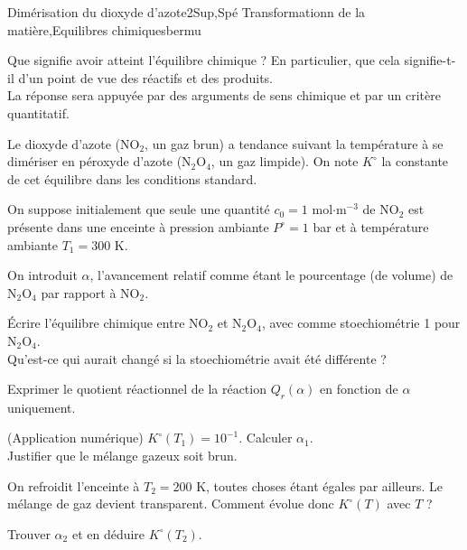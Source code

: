 
\begin{exercise}{Dimérisation du dioxyde d'azote}{2}{Sup,Spé}
{Transformationn de la matière,Equilibres chimiques}{bermu}

\begin{questions}
\questioncours Que signifie avoir atteint l'équilibre chimique ? En particulier, que cela signifie-t-il d'un point de vue des réactifs et des produits. \\
La réponse sera appuyée par des arguments de sens chimique et par un critère quantitatif.

\begin{EnvUplevel}
     Le dioxyde d'azote (NO$_2$, un gaz brun) a tendance suivant la température à se dimériser en péroxyde d'azote (N$_2$O$_4$, un gaz limpide). On note $K^\circ$ la constante de cet équilibre dans les conditions standard. 
     
     On suppose initialement que seule une quantité $c_0 = 1$ mol$\cdot$m$^{-3}$ de NO$_2$ est présente dans une enceinte à pression ambiante $P^\circ = 1$ bar et à température ambiante $T_1 = 300$ K.
     
     On introduit $\alpha$, l'avancement relatif comme étant le pourcentage (de volume) de N$_2$O$_4$ par rapport à NO$_2$.
\end{EnvUplevel}

\question \'Ecrire l'équilibre chimique entre NO$_2$ et N$_2$O$_4$, avec comme stoechiométrie 1 pour N$_2$O$_4$. \\
Qu'est-ce qui aurait changé si la stoechiométrie avait été différente ?

\question Exprimer le quotient réactionnel de la réaction $Q_r(\alpha)$ en fonction de $\alpha$ uniquement.

\question (\textsf{Application numérique}) $K^\circ(T_1) = 10^{-1}$. Calculer $\alpha_1$. \\
Justifier que le mélange gazeux soit brun.

\question On refroidit l'enceinte à $T_2 = 200$ K, toutes choses étant égales par ailleurs. Le mélange de gaz devient transparent. Comment évolue donc $K^\circ(T)$ avec $T$ ?


\question Trouver $\alpha_2$ et en déduire $K^\circ(T_2)$.


\end{questions}

\end{exercise}


